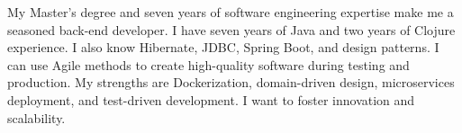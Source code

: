 \vspace*{-15pt}
\begin{referees}
\par{
    My Master's degree and seven years of software engineering expertise make me a seasoned back-end developer. I have seven years of Java and two years of Clojure experience. I also know Hibernate, JDBC, Spring Boot, and design patterns. I can use Agile methods to create high-quality software during testing and production. My strengths are Dockerization, domain-driven design, microservices deployment, and test-driven development. I want to foster innovation and scalability.}
\end{referees}	